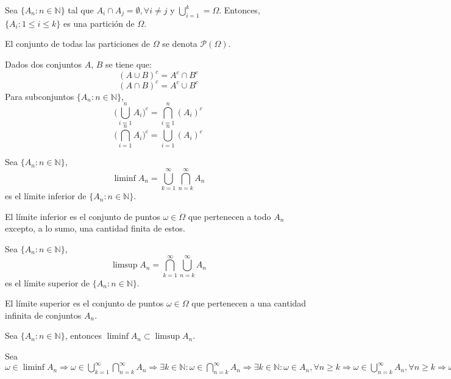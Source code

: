 \begin{defn}[Partición]
Sea  $\{A_n: n\in\mathbb{N}\}$ tal que $A_i \cap A_j = \emptyset, \forall i\neq j$ y $\bigcup_{i=1}^k = \Omega$. Entonces, $\{A_i: 1\leq i \leq k\}$ es una partición de $\Omega$.
\end{defn}
\begin{obs}
El conjunto de todas las particiones de $\Omega$ se denota $\mathcal{P}(\Omega)$.
\end{obs}

\begin{prop}
Dados dos conjuntos $A$, $B$ se tiene que: \[ (A\cup B)^c = A^c \cap B^c \] \[ (A\cap B)^c = A^c \cup B^c \] Para subconjuntos $\{A_n: n\in\mathbb{N}\}$, \[ \bigg(\bigcup_{i=1}^n A_i\bigg)^c = \bigcap_{i=1}^n (A_i)^c\] \[ \bigg(\bigcap_{i=1}^n A_i\bigg)^c = \bigcup_{i=1}^n (A_i)^c\]
\end{prop}

\begin{defn}
Sea $\{A_n: n\in\mathbb{N}\}$, \[ \liminf A_n = \bigcup_{k=1}^\infty \bigcap_{n=k}^\infty A_n \] es el límite inferior de $\{A_n: n\in\mathbb{N}\}$.
\end{defn}

\begin{obs}
El límite inferior es el conjunto de puntos $\omega\in\Omega$ que pertenecen a todo $A_n$ excepto, a lo sumo, una cantidad finita de estos.
\end{obs}

\begin{defn}
Sea $\{A_n: n\in\mathbb{N}\}$, \[ \limsup A_n = \bigcap_{k=1}^\infty \bigcup_{n=k}^\infty A_n \] es el límite superior de $\{A_n: n\in\mathbb{N}\}$.
\end{defn}

\begin{obs}
El límite superior es el conjunto de puntos $\omega\in\Omega$ que pertenecen a una cantidad infinita de conjuntos $A_n$.
\end{obs}

\begin{prop}
Sea  $\{A_n: n\in\mathbb{N}\}$, entonces $\liminf A_n \subset \limsup A_n$.
\end{prop}

\begin{dem}
Sea $\omega\in\liminf A_n \Rightarrow \omega \in \bigcup_{k=1}^\infty \bigcap_{n=k}^\infty A_n \Rightarrow \exists k\in\mathbb{N}: \omega\in\bigcap_{n=k}^\infty A_n \Rightarrow \exists k\in\mathbb{N}: \omega\in A_n, \forall n\geq k \Rightarrow \omega\in\bigcup_{n=k}^\infty A_n, \forall n\geq k \Rightarrow \omega\in\bigcap_{k=1}^\infty \bigcup_{n=k}^\infty A_n \Rightarrow \omega\in\limsup A_n.$
\end{dem}


